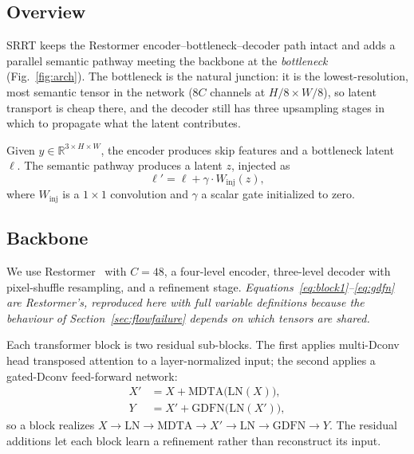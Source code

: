 \documentclass[conference]{IEEEtran}
\begin{document}
\subsection{Overview}
SRRT keeps the Restormer encoder--bottleneck--decoder path intact and adds a
parallel semantic pathway meeting the backbone at the \emph{bottleneck}
(Fig.~\ref{fig:arch}). The bottleneck is the natural junction: it is the
lowest-resolution, most semantic tensor in the network ($8C$ channels at
$H/8\times W/8$), so latent transport is cheap there, and the decoder still has
three upsampling stages in which to propagate what the latent contributes.

Given $y \in \mathbb{R}^{3\times H\times W}$, the encoder produces skip
features and a bottleneck latent $\ell$. The semantic pathway produces a latent
$z$, injected as
\begin{equation}
\ell' = \ell + \gamma \cdot W_{\text{inj}}(z),
\label{eq:inject}
\end{equation}
where $W_{\text{inj}}$ is a $1\!\times\!1$ convolution and $\gamma$ a scalar
gate initialized to zero.

\subsection{Backbone}
We use Restormer~\cite{restormer} with $C=48$, a four-level encoder, three-level
decoder with pixel-shuffle resampling, and a refinement stage.
\emph{Equations~\eqref{eq:block1}--\eqref{eq:gdfn} are Restormer's, reproduced
here with full variable definitions because the behaviour of
Section~\ref{sec:flowfailure} depends on which tensors are shared.}

Each transformer block is two residual sub-blocks. The first applies
multi-Dconv head transposed attention to a layer-normalized input; the second
applies a gated-Dconv feed-forward network:
\begin{align}
X' &= X + \mathrm{MDTA}\big(\mathrm{LN}(X)\big), \label{eq:block1}\\
Y  &= X' + \mathrm{GDFN}\big(\mathrm{LN}(X')\big), \label{eq:block2}
\end{align}
so a block realizes $X \to \mathrm{LN} \to \mathrm{MDTA} \to X' \to
\mathrm{LN} \to \mathrm{GDFN} \to Y$. The residual additions let each block
learn a refinement rather than reconstruct its input.
\end{document}

